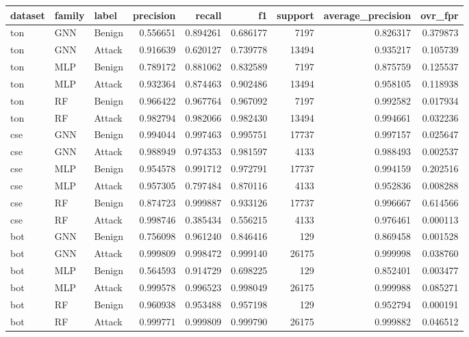 \begin{tabular}{lllrrrrrr}
\toprule
dataset & family & label & precision & recall & f1 & support & average\_precision & ovr\_fpr \\
\midrule
ton & GNN & Benign & 0.556651 & 0.894261 & 0.686177 & 7197 & 0.826317 & 0.379873 \\
ton & GNN & Attack & 0.916639 & 0.620127 & 0.739778 & 13494 & 0.935217 & 0.105739 \\
ton & MLP & Benign & 0.789172 & 0.881062 & 0.832589 & 7197 & 0.875759 & 0.125537 \\
ton & MLP & Attack & 0.932364 & 0.874463 & 0.902486 & 13494 & 0.958105 & 0.118938 \\
ton & RF & Benign & 0.966422 & 0.967764 & 0.967092 & 7197 & 0.992582 & 0.017934 \\
ton & RF & Attack & 0.982794 & 0.982066 & 0.982430 & 13494 & 0.994661 & 0.032236 \\
cse & GNN & Benign & 0.994044 & 0.997463 & 0.995751 & 17737 & 0.997157 & 0.025647 \\
cse & GNN & Attack & 0.988949 & 0.974353 & 0.981597 & 4133 & 0.988493 & 0.002537 \\
cse & MLP & Benign & 0.954578 & 0.991712 & 0.972791 & 17737 & 0.994159 & 0.202516 \\
cse & MLP & Attack & 0.957305 & 0.797484 & 0.870116 & 4133 & 0.952836 & 0.008288 \\
cse & RF & Benign & 0.874723 & 0.999887 & 0.933126 & 17737 & 0.996667 & 0.614566 \\
cse & RF & Attack & 0.998746 & 0.385434 & 0.556215 & 4133 & 0.976461 & 0.000113 \\
bot & GNN & Benign & 0.756098 & 0.961240 & 0.846416 & 129 & 0.869458 & 0.001528 \\
bot & GNN & Attack & 0.999809 & 0.998472 & 0.999140 & 26175 & 0.999998 & 0.038760 \\
bot & MLP & Benign & 0.564593 & 0.914729 & 0.698225 & 129 & 0.852401 & 0.003477 \\
bot & MLP & Attack & 0.999578 & 0.996523 & 0.998049 & 26175 & 0.999988 & 0.085271 \\
bot & RF & Benign & 0.960938 & 0.953488 & 0.957198 & 129 & 0.952794 & 0.000191 \\
bot & RF & Attack & 0.999771 & 0.999809 & 0.999790 & 26175 & 0.999882 & 0.046512 \\
\bottomrule
\end{tabular}
